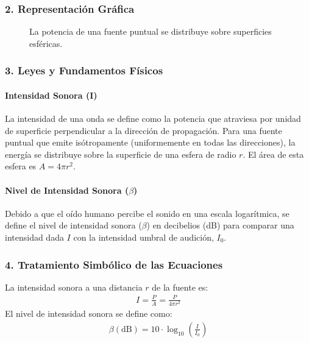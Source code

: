 \subsubsection*{2. Representación Gráfica}
\begin{figure}[H]
    \centering
    \caption{La potencia de una fuente puntual se distribuye sobre superficies esféricas.}
\end{figure}

\subsubsection*{3. Leyes y Fundamentos Físicos}
\paragraph*{Intensidad Sonora (I)}
La intensidad de una onda se define como la potencia que atraviesa por unidad de superficie perpendicular a la dirección de propagación. Para una fuente puntual que emite isótropamente (uniformemente en todas las direcciones), la energía se distribuye sobre la superficie de una esfera de radio $r$. El área de esta esfera es $A = 4\pi r^2$.
\paragraph*{Nivel de Intensidad Sonora ($\beta$)}
Debido a que el oído humano percibe el sonido en una escala logarítmica, se define el nivel de intensidad sonora ($\beta$) en decibelios (dB) para comparar una intensidad dada $I$ con la intensidad umbral de audición, $I_0$.

\subsubsection*{4. Tratamiento Simbólico de las Ecuaciones}
La intensidad sonora a una distancia $r$ de la fuente es:
\begin{gather}
    I = \frac{P}{A} = \frac{P}{4\pi r^2}
\end{gather}
El nivel de intensidad sonora se define como:
\begin{gather}
    \beta (\text{dB}) = 10 \cdot \log_{10}\left(\frac{I}{I_0}\right)
\end{gather}

